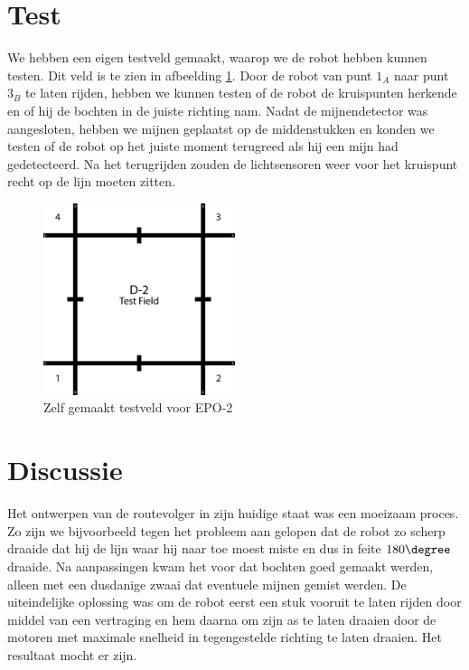 \documentclass{report}
\begin{document}
\section{Test}
We hebben een eigen testveld gemaakt, waarop we de robot hebben kunnen testen.
Dit veld is te zien in afbeelding \ref{fig:testfield}.
Door de robot van punt $1_A$ naar punt $3_B$ te laten rijden, hebben we kunnen testen of de robot de kruispunten herkende en of hij de bochten in de juiste richting nam.
Nadat de mijnendetector was aangesloten, hebben we mijnen geplaatst op de middenstukken en konden we testen of de robot op het juiste moment terugreed als hij een mijn had gedetecteerd. Na het terugrijden zouden de lichtsensoren weer voor het kruispunt recht op de lijn moeten zitten.

\begin{figure}[H]
	\centering
	\includegraphics[width=0.5\textwidth]{d-2_test_field.png}
	\caption{Zelf gemaakt testveld voor EPO-2}
	\label{fig:testfield}
\end{figure}

\section{Discussie}

Het ontwerpen van de routevolger in zijn huidige staat was een moeizaam proces. Zo zijn we bijvoorbeeld tegen het probleem aan gelopen dat de robot zo scherp draaide dat hij de lijn waar hij naar toe moest miste en dus in feite $180\degree$ draaide. Na aanpassingen kwam het voor dat bochten goed gemaakt werden, alleen met een dusdanige zwaai dat eventuele mijnen gemist werden. De uiteindelijke oplossing was om de robot eerst een stuk vooruit te laten rijden door middel van een vertraging en hem daarna om zijn as te laten draaien door de motoren met maximale snelheid in tegengestelde richting te laten draaien. Het resultaat mocht er zijn.

\end{document}
